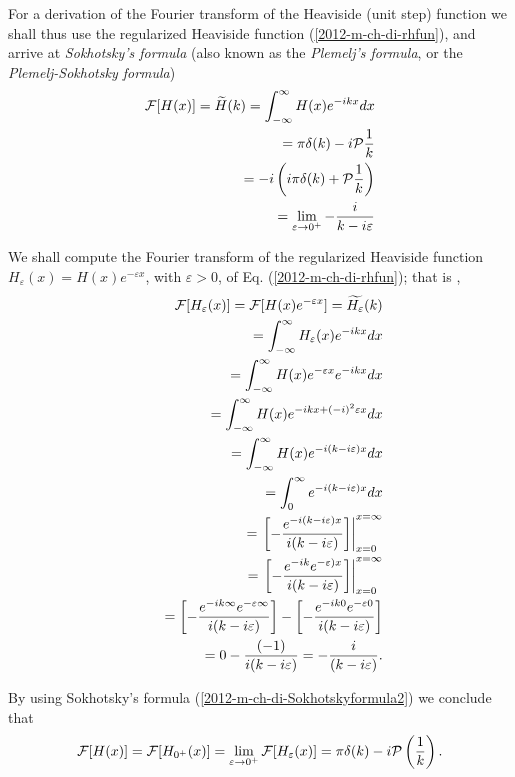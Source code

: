 \fi
For a derivation of  the Fourier transform of the Heaviside (unit step) function
we shall thus use the  regularized Heaviside function (\ref{2012-m-ch-di-rhfun}), and arrive at
{\em Sokhotsky's  formula} (also known as the {\em Plemelj's  formula}, or the {\em Plemelj-Sokhotsky formula})
\begin{equation}
\begin{split}
 {\cal F}[H(x)]=\widetilde{H}(k)=   \int_{-\infty}^\infty  H(x) e^{-i{kx}} dx   \\
\qquad =    \pi \delta(k) -  i {\cal P}  \frac{1}{k} \\
\qquad =   -i \left(i\pi \delta(k) + {\cal P} \frac{1}{k}\right)\\
\qquad =   \lim_{\varepsilon \rightarrow 0^+} -\frac{i}{k-i\varepsilon }
\end{split}
\end{equation}

{\color{OliveGreen}
\bproof
We shall compute the Fourier transform of the regularized Heaviside function
$H_\varepsilon (x) =H(x)e^{-\varepsilon x}$, with $\varepsilon >0$, of Eq. (\ref{2012-m-ch-di-rhfun}); that is  \cite{sommer-di},
\begin{equation}
\begin{split}
 {\cal F}[H_\varepsilon (x)] =
 {\cal F}[H(x)e^{-\varepsilon x}]
=\widetilde{H_\varepsilon }(k)
\\ \qquad
=   \int_{-\infty}^\infty  H_\varepsilon (x) e^{-i{kx}} dx
\\ \qquad
=   \int_{-\infty}^\infty  H(x)e^{-\varepsilon x}  e^{-i{kx}} dx
\\ \qquad
=   \int_{-\infty}^\infty  H(x) e^{-i{kx}+(-i)^2\varepsilon x}  dx
\\ \qquad
=   \int_{-\infty}^\infty  H(x) e^{-i(k - i \varepsilon ) x}  dx
\\ \qquad
=   \int_{0}^\infty  e^{-i(k - i \varepsilon ) x}  dx
\\ \qquad
=  \left. \left[ -\frac{ e^{-i(k - i \varepsilon ) x}}{i(k - i \varepsilon ) } \right] \right|_{x=0}^{x=\infty}
\\ \qquad
=  \left. \left[ -\frac{ e^{-ik} e^{- \varepsilon ) x}}{i(k - i \varepsilon ) } \right] \right|_{x=0}^{x=\infty}
\\ \qquad
=  \left[ -\frac{ e^{-ik\infty} e^{- \varepsilon  \infty}}{i(k - i \varepsilon ) } \right]
-  \left[ -\frac{ e^{-ik0} e^{- \varepsilon  0}}{i(k - i \varepsilon ) } \right]
\\ \qquad
=    0 - \frac{ (-1)}{i(k - i \varepsilon ) }
=     -\frac{ i}{(k - i \varepsilon ) }
.
\end{split}
\end{equation}

By using Sokhotsky's  formula
(\ref{2012-m-ch-di-Sokhotskyformula2})
we conclude that
\begin{equation}
 {\cal F}[H(x)] =
 {\cal F}[H_{0^+} (x)] =
 \lim_{\varepsilon \rightarrow 0^+} {\cal F}[H_\varepsilon (x)] =
  \pi \delta (k)   -i {\cal P} \left(\frac{1}{k}\right)
.
\label{2012-m-ch-di-fthfu}
\end{equation}

\eproof
}



